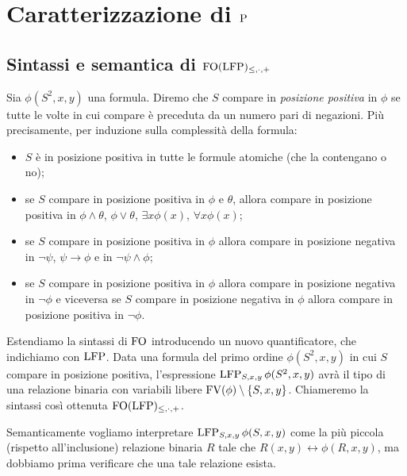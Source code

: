 \chapter{Caratterizzazione di \texorpdfstring{$\P$}{P}}

\section{Sintassi e semantica di \texorpdfstring{$\FOLFP$}{FO(LFP)}}

\begin{definizione}
 Sia $\phi(S^2,x,y)$ una formula.
 Diremo che $S$ compare in \emph{posizione positiva} in $\phi$ se tutte le volte
 in cui compare è preceduta da un
 numero pari di negazioni. Più precisamente, per induzione sulla complessità
 della formula:
 \begin{itemize}
  \item $S$ è in posizione positiva in tutte le formule atomiche (che la contengano o no);
  \item se $S$ compare in posizione positiva in $\phi$ e $\theta$, allora compare
  in posizione positiva in $\phi \land \theta$, $\phi \lor \theta$, $\exists x \phi(x)$,
  $\forall x \phi(x)$;
  \item se $S$ compare in posizione positiva in $\phi$ allora compare in posizione
  negativa in $\lnot \psi$, $\psi \to \phi$ e in $\lnot \psi \land \phi$;
  \item se $S$ compare in posizione positiva in $\phi$ allora compare in posizione
  negativa in $\lnot \phi$ e viceversa se $S$ compare in posizione negativa in $\phi$
  allora compare in posizione
  positiva in $\lnot \phi$.
 \end{itemize}
\end{definizione}

\begin{definizione}
 Estendiamo la sintassi di $\FO$ introducendo un nuovo quantificatore, che
 indichiamo con $\LFP$. Data una
 formula del primo ordine $\phi(S^2,x,y)$ in cui $S$ compare in posizione positiva,
 l'espressione $\LFP_{S,x,y} \phi(S^2,x,y)$ avrà il tipo di una relazione binaria
 con variabili
 libere $\FV(\phi) \setminus \{S,x,y\}$.
 Chiameremo la sintassi così ottenuta $\FOLFP$.
\end{definizione}

Semanticamente vogliamo interpretare $\LFP_{S,x,y} \phi(S,x,y)$ come la più
piccola (rispetto all'inclusione) relazione binaria $R$ tale che $R(x,y) \leftrightarrow \phi(R,x,y)$, ma dobbiamo
prima verificare che una tale relazione esista.

